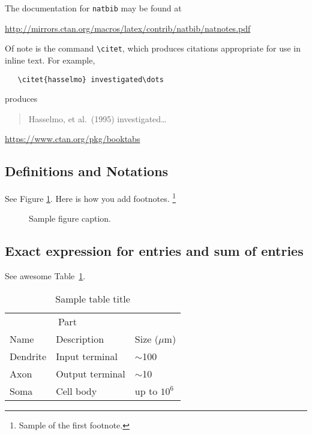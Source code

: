 \documentclass{article}
\theoremstyle{definition}
\theoremstyle{remark}
\numberwithin{equation}{section}
\begin{document}
The documentation for \verb+natbib+ may be found at
\begin{center}
  \url{http://mirrors.ctan.org/macros/latex/contrib/natbib/natnotes.pdf}
\end{center}
Of note is the command \verb+\citet+, which produces citations
appropriate for use in inline text.  For example,
\begin{verbatim}
   \citet{hasselmo} investigated\dots
\end{verbatim}
produces
\begin{quote}
  Hasselmo, et al.\ (1995) investigated\dots
\end{quote}

\begin{center}
  \url{https://www.ctan.org/pkg/booktabs}
\end{center}


\subsection{Definitions and Notations}
\lipsum[10] 
See Figure \ref{fig:fig1}. Here is how you add footnotes. \footnote{Sample of the first footnote.}
\lipsum[11] 

\begin{figure}
  \centering
  \fbox{\rule[-.5cm]{4cm}{4cm} \rule[-.5cm]{4cm}{0cm}}
  \caption{Sample figure caption.}
  \label{fig:fig1}
\end{figure}

\subsection{Exact expression for entries and sum of entries}
\lipsum[12]
See awesome Table~\ref{tab:table}.

\begin{table}
 \caption{Sample table title}
  \centering
  \begin{tabular}{lll}
    \toprule
    \multicolumn{2}{c}{Part}                   \\
    \cmidrule(r){1-2}
    Name     & Description     & Size ($\mu$m) \\
    \midrule
    Dendrite & Input terminal  & $\sim$100     \\
    Axon     & Output terminal & $\sim$10      \\
    Soma     & Cell body       & up to $10^6$  \\
    \bottomrule
  \end{tabular}
  \label{tab:table}
\end{table}
\end{document}
